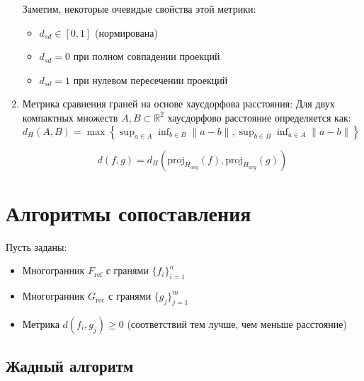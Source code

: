\documentclass[a4paper,14pt]{extarticle}
\theoremstyle{remark} %
\begin{document}
\begin{enumerate}
        Заметим, некоторые очевидые свойства этой метрики:
        \begin{itemize}
            \item $d_{sd} \in [0,1]$ (нормирована)
            \item $d_{sd} = 0$ при полном совпадении проекций
            \item $d_{sd} = 1$ при нулевом пересечении проекций
        \end{itemize}


    \item Метрика сравнения граней на основе хаусдорфова расстояния:
        Для двух компактных множеств $A,B \subset \mathbb{R}^2$ хаусдорфово расстояние определяется как:
        $d_H(A,B) = \max\left\{\sup_{a \in A} \inf_{b \in B} \|a - b\|, \sup_{b \in B} \inf_{a \in A} \|a - b\|\right\}$

        \begin{equation}
            d(f,g) = d_H(\text{proj}_{H_{avg}}(f), \text{proj}_{H_{avg}}(g))
        \end{equation}

\end{enumerate}

\section{Алгоритмы сопоставления}

Пусть заданы:
\begin{itemize}
    \item Многогранник $F_{\text{ref}}$ с гранями $\{f_i\}_{i=1}^n$
    \item Многогранник $G_{\text{rec}}$ с гранями $\{g_j\}_{j=1}^m$
    \item Метрика $d(f_i, g_j) \geq 0$ (соответствий тем лучше, чем меньше расстояние)
\end{itemize}

\subsection{Жадный алгоритм}
\end{document}
